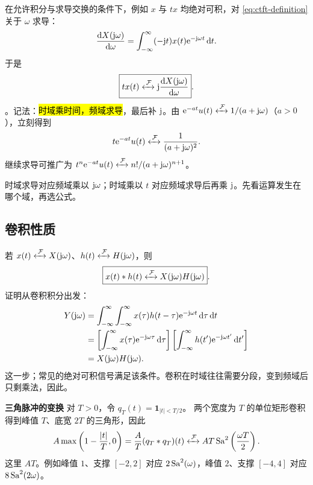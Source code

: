 在允许积分与求导交换的条件下，例如 $x$ 与 $t x$ 均绝对可积，对
\cref{eq:ctft-definition} 关于 $\omega$ 求导：
\[
  \frac{\mathop{}\!\mathrm{d} X(\mathrm{j}\omega)}{\mathop{}\!\mathrm{d}\omega}
     =\int_{-\infty}^{\infty}(-\mathrm{j} t)x(t)\mathrm{e}^{-\mathrm{j}\omega t}\mathop{}\!\mathrm{d} t.
\]
于是
\begin{equation}
  \boxed{t x(t)
  \mathrel{\xleftrightarrow{\,\mathcal{F}\,}}
  \mathrm{j}\frac{\mathop{}\!\mathrm{d} X(\mathrm{j}\omega)}{\mathop{}\!\mathrm{d}\omega}}.
  \label{eq:ctft-frequency-differentiation}
\end{equation}
。记法：\hl{时域乘时间，频域求导}，最后补 $\mathrm{j}$。由 $\mathrm{e}^{-at}u(t)\mathrel{\xleftrightarrow{\,\mathcal{F}\,}}1/(a+\mathrm{j}\omega)$（$a>0$），立刻得到
\begin{equation}
  t\mathrm{e}^{-at}u(t)
  \mathrel{\xleftrightarrow{\,\mathcal{F}\,}}
  \frac{1}{(a+\mathrm{j}\omega)^2}.
  \label{eq:ctft-ramp-exponential-pair}
\end{equation}
继续求导可推广为 $t^n\mathrm{e}^{-at}u(t)\mathrel{\xleftrightarrow{\,\mathcal{F}\,}} n!/(a+\mathrm{j}\omega)^{n+1}$。

\begin{pitfall}[混淆两种微分性质]
  时域求导对应频域乘以 $\mathrm{j}\omega$；时域乘以 $t$ 对应频域求导后再乘 $\mathrm{j}$。先看运算发生在哪个域，再选公式。
\end{pitfall}

\subsection{卷积性质}

若 $x(t)\mathrel{\xleftrightarrow{\,\mathcal{F}\,}} X(\mathrm{j}\omega)$、$h(t)\mathrel{\xleftrightarrow{\,\mathcal{F}\,}} H(\mathrm{j}\omega)$，则
\begin{equation}
  \boxed{x(t)\mathbin{\ast} h(t)
  \mathrel{\xleftrightarrow{\,\mathcal{F}\,}}
  X(\mathrm{j}\omega)H(\mathrm{j}\omega)}.
  \label{eq:ctft-convolution-property}
\end{equation}
证明从卷积积分出发：
\begin{align*}
  Y(\mathrm{j}\omega)
  &=\int_{-\infty}^{\infty}\int_{-\infty}^{\infty}
    x(\tau)h(t-\tau)\mathrm{e}^{-\mathrm{j}\omega t}\mathop{}\!\mathrm{d}\tau\mathop{}\!\mathrm{d} t\\
  &=\left[\int_{-\infty}^{\infty}x(\tau)\mathrm{e}^{-\mathrm{j}\omega\tau}\mathop{}\!\mathrm{d}\tau\right]
    \left[\int_{-\infty}^{\infty}h(t')\mathrm{e}^{-\mathrm{j}\omega t'}\mathop{}\!\mathrm{d} t'\right]\\
  &=X(\mathrm{j}\omega)H(\mathrm{j}\omega).
\end{align*}
这一步；常见的绝对可积信号满足该条件。卷积在时域往往需要分段，变到频域后只剩乘法，因此。

\noindent\textbf{三角脉冲的变换}\quad
对 $T>0$，令 $q_T(t)=\mathbf 1_{|t|<T/2}$。
两个宽度为 $T$ 的单位矩形卷积得到峰值 $T$、底宽 $2T$ 的三角形，因此
\begin{equation}
  A\max\left(1-\frac{|t|}{T},0\right)
  =\frac{A}{T}(q_T\mathbin{\ast} q_T)(t)
  \mathrel{\xleftrightarrow{\,\mathcal{F}\,}} AT\operatorname{Sa}^2\left(\frac{\omega T}{2}\right).
  \label{eq:ctft-triangle-pair}
\end{equation}
这里 $AT$。例如峰值 $1$、支撑 $[-2,2]$ 对应
$2\operatorname{Sa}^2(\omega)$，峰值 $2$、支撑 $[-4,4]$ 对应 $8\operatorname{Sa}^2(2\omega)$。


